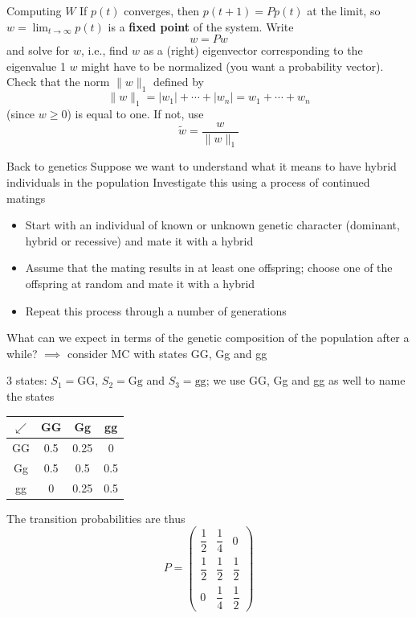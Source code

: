 \documentclass[aspectratio=169]{beamer}
\begin{document}
\begin{frame}{Computing $W$}
If $p(t)$ converges, then $p(t+1)=Pp(t)$ at the limit, so $w=\lim_{t\to\infty}p(t)$ is a \textbf{fixed point} of the system. Write
\[
w=Pw
\]
and solve for $w$, i.e., find $w$ as a (right) eigenvector corresponding to the eigenvalue 1
\vfill
$w$ might have to be normalized (you want a probability vector). Check that the norm $\|w\|_1$ defined by
\[
\|w\|_1=|w_1|+\cdots+|w_n|=w_1+\cdots+w_n
\]
(since $w\geq 0$) is equal to one. If not, use
\[
\tilde w = \frac{w}{\|w\|_1}
\]
\end{frame}


\begin{frame}{Back to genetics}
Suppose we want to understand what it means to have hybrid individuals in the population
\vfill
Investigate this using a process of continued matings
\begin{itemize}
\item Start with an individual of known or unknown
genetic character (dominant, hybrid or recessive) and mate it with a hybrid
\item Assume that the mating results in at least one
offspring; choose one of the offspring at random and mate it with a hybrid
\item Repeat this process through a number of generations
\end{itemize}
\vfill
What can we expect in terms of the genetic composition of the population after a while? 
\vfill
$\implies$ consider MC with states GG, Gg and gg
\end{frame}


\begin{frame}
3 states: $S_1=\textrm{GG}$, $S_2=\textrm{Gg}$ and $S_3=\textrm{gg}$; we use GG, Gg and gg as well to name the states
\vfill
\begin{center}
\begin{tabular}{c|ccc}
$\swarrow$ & GG & Gg & gg \\
\hline
GG & 0.5 & 0.25 & 0 \\
Gg & 0.5 & 0.5 & 0.5 \\
gg & 0 & 0.25 & 0.5
\end{tabular}
\end{center}
\vfill
The transition probabilities are thus
\[
P=\begin{pmatrix}
\dfrac 12 & \dfrac 14 & 0 \\[10pt]
\dfrac 12 & \dfrac 12 & \dfrac 12 \\[10pt]
0 & \dfrac 14 & \dfrac 12
\end{pmatrix}
\]
\end{frame}
\end{document}
